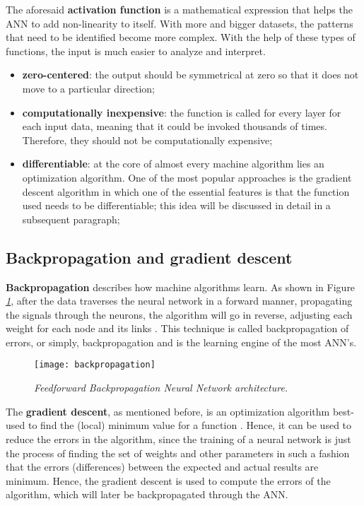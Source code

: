 The aforesaid \textbf{activation function} is a mathematical expression that helps
the ANN to add non-linearity to itself. With more and bigger datasets,
the patterns that need to be identified become more complex.
With the help of these types of functions, the input is much easier to analyze and interpret.

\begin{itemize}
  \item{
        \textbf{zero-centered}: the output should be symmetrical
        at zero so that it does not move to a particular direction;
        }
  \item{
        \textbf{computationally inexpensive}: the function is called for every layer
        for each input data, meaning that it could be invoked thousands of times.
        Therefore, they should not be computationally expensive;
        }
  \item{
        \textbf{differentiable}: at the core of almost every machine algorithm lies
        an optimization algorithm. One of the most popular
        approaches is the gradient descent algorithm in which one of the essential
        features is that the function used needs to be differentiable;
        this idea will be discussed in detail in a subsequent paragraph;
        }
\end{itemize}



\subsection{Backpropagation and gradient descent}

\textbf{Backpropagation} describes how machine algorithms learn.
As shown in Figure \emph{\ref{fig:backpropagation}},
after the data traverses the neural network in a forward manner,
propagating the signals through the neurons,
the algorithm will go in reverse, adjusting each weight for each node and its links \cite{Goodfellow-et-al-2016}.
This technique is called backpropagation of errors, or simply,
backpropagation and is the learning engine of the most ANN's.

\begin{figure}[h]
  \centering
  \texttt{[image: backpropagation]}
  \caption{\emph{Feedforward Backpropagation Neural Network architecture. \cite{backpropagation}}}
  \label{fig:backpropagation}
\end{figure}

The \textbf{gradient descent}, as mentioned before,
is an optimization algorithm best-used to find the (local) minimum value for a function \cite{brownlee2016master}.
Hence, it can be used to reduce the errors in the algorithm,
since the training of a neural network is just the process of finding the set of weights and other
parameters in such a fashion that the errors (differences) between the expected and actual results are minimum.
Hence, the gradient descent is used to compute the errors of the algorithm, which will later be backpropagated
through the ANN.



